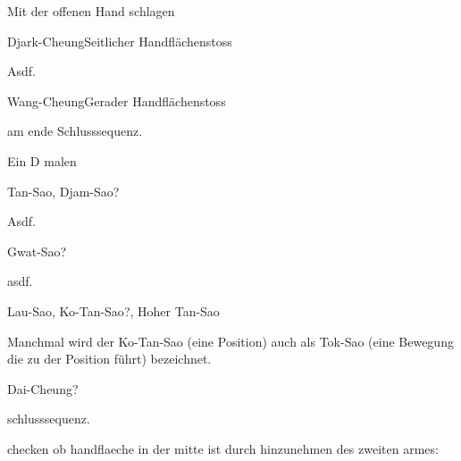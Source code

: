 
\begin{WTSatz}{Mit der offenen Hand schlagen}%

	
	\begin{WTSatzTeil}{Djark-Cheung}{Seitlicher Handfl\"achenstoss}

		Asdf.
	\end{WTSatzTeil}
	\begin{WTSatzTeil}{Wang-Cheung}{Gerader Handfl\"achenstoss}

		am ende Schlusssequenz.
	\end{WTSatzTeil}
\end{WTSatz}



\begin{WTSatz}{Ein D malen}%

	
	\begin{WTSatzTeil}{Tan-Sao, Djam-Sao}{?}
		
		Asdf.
	\end{WTSatzTeil}
	\begin{WTSatzTeil}{Gwat-Sao}{?}
		
		asdf.
	\end{WTSatzTeil}
	\begin{WTSatzTeil}{Lau-Sao, Ko-Tan-Sao}{?, Hoher Tan-Sao}
		
		Manchmal wird der Ko-Tan-Sao (eine Position) auch als Tok-Sao (eine Bewegung die zu der Position f\"uhrt) bezeichnet.
	\end{WTSatzTeil}
	\begin{WTSatzTeil}{Dai-Cheung}{?}
		
		schlusssequenz.
		
		checken ob handflaeche in der mitte ist durch hinzunehmen des zweiten armes:
	\end{WTSatzTeil}
\end{WTSatz}

